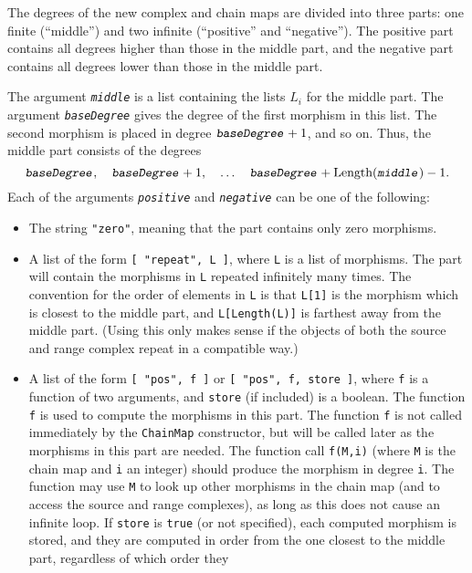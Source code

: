 \documentclass[a4paper,11pt]{report}
\begin{document}
{{{ The degrees of the new complex and chain maps are divided into three parts:
one finite (``middle'') and two infinite (``positive'' and ``negative''). The positive part contains all degrees higher than those in the middle
part, and the negative part contains all degrees lower than those in the
middle part.

 The argument \mbox{\texttt{\slshape middle}} is a list containing the lists $L_i$ for the middle part. The argument \mbox{\texttt{\slshape baseDegree}} gives the degree of the first morphism in this list. The second morphism is
placed in degree $\mbox{\texttt{\slshape baseDegree}}+1$, and so on. Thus, the middle part consists of the degrees 
\[ \mbox{\texttt{\slshape baseDegree}},\quad \mbox{\texttt{\slshape baseDegree}} + 1,\quad \ldots\quad \mbox{\texttt{\slshape baseDegree}} + \text{Length}(\mbox{\texttt{\slshape middle}}) - 1. \]
 Each of the arguments \mbox{\texttt{\slshape positive}} and \mbox{\texttt{\slshape negative}} can be one of the following: 
\begin{itemize}
\item The string \texttt{"zero"}, meaning that the part contains only zero morphisms.
\item A list of the form \texttt{[ "repeat", L ]}, where \texttt{L} is a list of morphisms. The part will contain the morphisms in \texttt{L} repeated infinitely many times. The convention for the order of elements in \texttt{L} is that \texttt{L[1]} is the morphism which is closest to the middle part, and \texttt{L[Length(L)]} is farthest away from the middle part. (Using this only makes sense if the
objects of both the source and range complex repeat in a compatible way.)
\item A list of the form \texttt{[ "pos", f ]} or \texttt{[ "pos", f, store ]}, where \texttt{f} is a function of two arguments, and \texttt{store} (if included) is a boolean. The function \texttt{f} is used to compute the morphisms in this part. The function \texttt{f} is not called immediately by the \texttt{ChainMap} constructor, but will be called later as the morphisms in this part are
needed. The function call \texttt{f(M,i)} (where \texttt{M} is the chain map and \texttt{i} an integer) should produce the morphism in degree \texttt{i}. The function may use \texttt{M} to look up other morphisms in the chain map (and to access the source and
range complexes), as long as this does not cause an infinite loop. If \texttt{store} is \texttt{true} (or not specified), each computed morphism is stored, and they are computed in
order from the one closest to the middle part, regardless of which order they

\end{itemize}}}}
\end{document}
